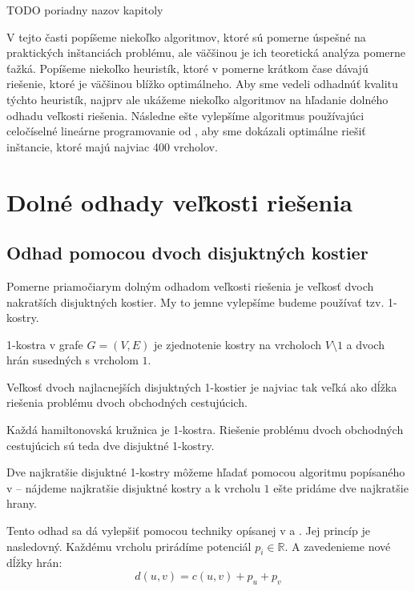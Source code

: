 TODO poriadny nazov kapitoly

V tejto časti popíšeme niekoľko algoritmov, ktoré sú pomerne úspešné
na praktických inštanciách problému, ale väčšinou je ich teoretická
analýza pomerne ťažká. Popíšeme niekoľko heuristík, ktoré v pomerne krátkom čase
dávajú riešenie, ktoré je väčšinou blížko optimálneho. Aby sme vedeli odhadnúť
kvalitu týchto heuristík, najprv ale ukážeme niekoľko algoritmov na hľadanie dolného odhadu
veľkosti riešenia. Následne ešte vylepšíme algoritmus používajúci
celočíselné lineárne programovanie od \cite{duchenne}, aby
sme dokázali optimálne riešiť inštancie, ktoré majú najviac 400 vrcholov.

\section{Dolné odhady veľkosti riešenia}

\subsection{Odhad pomocou dvoch disjuktných kostier}

Pomerne priamočiarym dolným odhadom veľkosti riešenia je veľkosť
dvoch nakratších disjuktných kostier. My to jemne vylepšíme budeme používať
tzv. 1-kostry.

\begin{definicia}
1-kostra v grafe $G=(V, E)$ je zjednotenie kostry na vrcholoch $V \setminus {1}$
a dvoch hrán susedných s vrcholom $1$. 
\end{definicia}

\begin{lema}
Veľkosť dvoch najlacnejších disjuktných 1-kostier je najviac tak veľká ako dĺžka
riešenia problému dvoch obchodných cestujúcich.
\end{lema}

\begin{dokaz}
Každá hamiltonovská kružnica je 1-kostra. Riešenie problému dvoch obchodných cestujúcich
sú teda dve disjuktné 1-kostry.
\end{dokaz}

Dve najkratšie disjuktné 1-kostry môžeme hľadať pomocou algoritmu popísaného v
\cite{spanning2} -- nájdeme najkratšie disjuktné kostry a k vrcholu $1$ ešte pridáme
dve najkratšie hrany.

Tento odhad sa dá vylepšiť pomocou techniky opísanej v \cite{heldtsp} a \cite{lower1}.
Jej princíp je nasledovný. Každému vrcholu prirádíme potenciál 
$p_i \in \mathbb{R}$.
A zavedenieme nové dĺžky hrán:
$$d(u, v) = c(u, v) + p_u + p_v$$

